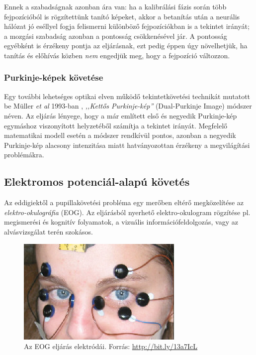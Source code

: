 Ennek a szabadságnak azonban ára van: ha a kalibrálási fázis során több fejpozícióból is rögzítettünk tanító képeket, akkor a betanítás után a neurális hálózat jó eséllyel fogja felismerni különböző fejpozíciókban is a tekintet irányát; a mozgási szabadság azonban a pontosság csökkenésével jár. A pontosság egyébként is érzékeny pontja az eljárásnak, ezt pedig éppen úgy növelhetjük, ha tanítás és előhívás közben \emph{nem} engedjük meg, hogy a fejpozíció változzon.

\subsubsection{Purkinje-képek követése}\label{sect:purkinje}

Egy további lehetséges optikai elven működő tekintetkövetési technikát mutatott be Müller \emph{et al} 1993-ban \cite{muller}, \emph{,,Kettős Purkinje-kép''} (Dual-Purkinje Image) módszer néven. Az eljárás lényege, hogy a már említett első és negyedik Purkinje-kép egymáshoz viszonyított helyzetéből számítja a tekintet irányát. Megfelelő matematikai modell esetén a módszer rendkívül pontos, azonban a negyedik Purkinje-kép alacsony intenzitása miatt hatványozottan érzékeny a megvilágítási problémákra.

\subsection{Elektromos potenciál-alapú követés}\label{sect:potencial}

Az eddigiektől a pupillakövetési probléma egy merőben eltérő megközelítése az \emph{elektro-okulográfia} (EOG). Az eljárásból nyerhető elektro-okulogram rögzítése pl. megismerési és kognitív folyamatok, a vizuális információfeldolgozás, vagy az alvásvizsgálat terén szokásos.

\begin{figure}[!ht]
\centering
\includegraphics[width=80mm, keepaspectratio]{figures/eog.png}
\caption{Az EOG eljárás elektródái. Forrás: \url{http://bit.ly/13a7IcL}}
\label{fig:eog}
\end{figure}

